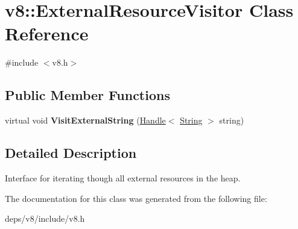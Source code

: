 \hypertarget{classv8_1_1_external_resource_visitor}{}\section{v8\+:\+:External\+Resource\+Visitor Class Reference}
\label{classv8_1_1_external_resource_visitor}


{\ttfamily \#include $<$v8.\+h$>$}

\subsection*{Public Member Functions}
\begin{DoxyCompactItemize}
\item 
\hypertarget{classv8_1_1_external_resource_visitor_ab00ff4cd0d0167894faa8331b68a58c6}{}virtual void {\bfseries Visit\+External\+String} (\hyperlink{classv8_1_1_handle}{Handle}$<$ \hyperlink{classv8_1_1_string}{String} $>$ string)\label{classv8_1_1_external_resource_visitor_ab00ff4cd0d0167894faa8331b68a58c6}

\end{DoxyCompactItemize}


\subsection{Detailed Description}
Interface for iterating though all external resources in the heap. 

The documentation for this class was generated from the following file\+:\begin{DoxyCompactItemize}
\item 
deps/v8/include/v8.\+h\end{DoxyCompactItemize}
